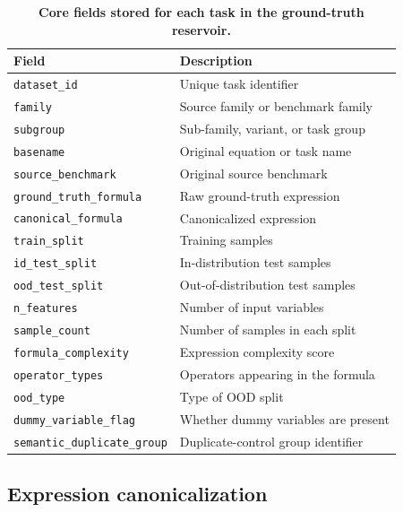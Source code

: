 \begin{table}[t]
\centering
\caption{\textbf{Core fields stored for each task in the ground-truth reservoir.}}
\label{tab:reservoir-schema}
\begin{tabular}{ll}
\toprule
Field & Description \\
\midrule
\texttt{dataset\_id} & Unique task identifier \\
\texttt{family} & Source family or benchmark family \\
\texttt{subgroup} & Sub-family, variant, or task group \\
\texttt{basename} & Original equation or task name \\
\texttt{source\_benchmark} & Original source benchmark \\
\texttt{ground\_truth\_formula} & Raw ground-truth expression \\
\texttt{canonical\_formula} & Canonicalized expression \\
\texttt{train\_split} & Training samples \\
\texttt{id\_test\_split} & In-distribution test samples \\
\texttt{ood\_test\_split} & Out-of-distribution test samples \\
\texttt{n\_features} & Number of input variables \\
\texttt{sample\_count} & Number of samples in each split \\
\texttt{formula\_complexity} & Expression complexity score \\
\texttt{operator\_types} & Operators appearing in the formula \\
\texttt{ood\_type} & Type of OOD split \\
\texttt{dummy\_variable\_flag} & Whether dummy variables are present \\
\texttt{semantic\_duplicate\_group} & Duplicate-control group identifier \\
\bottomrule
\end{tabular}
\end{table}

\subsection{Expression canonicalization}

